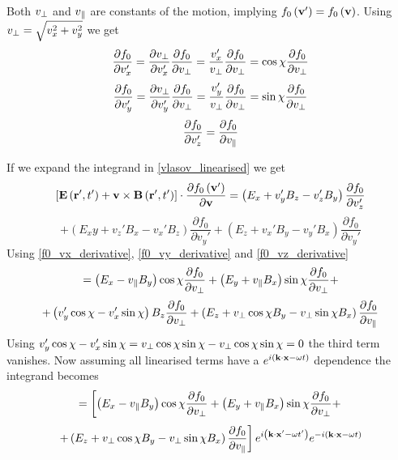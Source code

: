 Both $v_\perp$ and $v_\parallel$ are constants of the motion, implying $f_0\left(\textbf{v}'\right) = f_0\left(\textbf{v}\right)$. Using $v_\perp = \sqrt{v_x^2+v_y^2}$ we get
\begin{equation}\label{f0_vx_derivative}
	\frac{\partial f_0}{\partial v_x'}=\frac{\partial v_\perp}{\partial v_x '}\frac{\partial f_0}{\partial v_\perp} = \frac{v_x'}{v_\perp}\frac{\partial f_0}{\partial v_\perp} = \cos\chi \frac{\partial f_0}{\partial v_\perp}
\end{equation}
\begin{equation}\label{f0_vy_derivative}
	\frac{\partial f_0}{\partial v_y'}=\frac{\partial v_\perp}{\partial v_y '}\frac{\partial f_0}{\partial v_\perp} = \frac{v_y'}{v_\perp}\frac{\partial f_0}{\partial v_\perp} = \sin\chi \frac{\partial f_0}{\partial v_\perp}
\end{equation}
\begin{equation}\label{f0_vz_derivative}
	\frac{\partial f_0}{\partial v_z '} = \frac{\partial f_0}{\partial v_\parallel}
\end{equation}

If we expand the integrand in \eqref{vlasov_linearised} we get
\begin{equation*}
	\left[ \textbf{E} \left(\textbf{r}', t'\right) + \textbf{v} \times \textbf{B}\left(\textbf{r}', t'\right) \right] \cdot \frac{\partial f_0 \left(\textbf{v}'\right)}{\partial \textbf{v}} = \left(E_x+v_y'B_z-v_z'B_y\right) \frac{\partial f_0}{\partial v_z'}
\end{equation*}
\begin{equation}
	+ \left(E_xy+v_z'B_x-v_x'B_z\right) \frac{\partial f_0}{\partial v_y'} + \left(E_z+v_x'B_y-v_y'B_x\right) \frac{\partial f_0}{\partial v_y'}
\end{equation}
Using \eqref{f0_vx_derivative}, \eqref{f0_vy_derivative} and \eqref{f0_vz_derivative}
\begin{equation*}
	= \left(E_x-v_\parallel B_y\right) \cos\chi\frac{\partial f_0}{\partial v_\perp} + \left(E_y+v_\parallel B_x\right) \sin\chi\frac{\partial f_0}{\partial v_\perp} + 
\end{equation*}
\begin{equation}
	+ \left(v_y'\cos\chi - v_x' \sin\chi\right)B_z \frac{\partial f_0}{\partial v_\perp} + \left(E_z + v_\perp \cos\chi B_y - v_\perp \sin\chi B_x\right)\frac{\partial f_0}{\partial v_\parallel}
\end{equation}
Using $v_y'\cos\chi - v_x' \sin\chi = v_\perp \cos \chi \sin \chi - v_\perp \cos \chi \sin \chi = 0$ the third term vanishes. Now assuming all linearised terms have a $e^{i\left(\textbf{k}\cdot\textbf{x}-\omega t\right)}$ dependence the integrand becomes
\begin{equation*}
	= \left[\left(E_x-v_\parallel B_y\right) \cos\chi\frac{\partial f_0}{\partial v_\perp} + \left(E_y+v_\parallel B_x\right) \sin\chi\frac{\partial f_0}{\partial v_\perp} + \right.
\end{equation*}
\begin{equation}\label{vlasov_linearised2}
	\left. + \left(E_z + v_\perp \cos\chi B_y - v_\perp \sin\chi B_x\right)\frac{\partial f_0}{\partial v_\parallel}\right] e^{i\left(\textbf{k}\cdot\textbf{x}'-\omega t'\right)} e^{-i\left(\textbf{k}\cdot\textbf{x}-\omega t\right)}
\end{equation}

